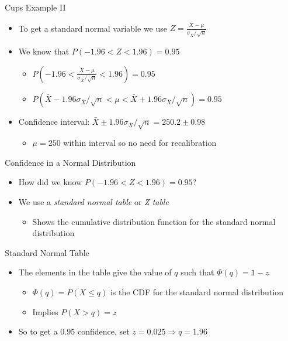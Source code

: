 \documentclass{beamer}
\begin{document}
\begin{frame}{Cups Example II}  
\begin{itemize} 
 \item To get a standard normal variable we use $Z = \frac{\bar{X} - \mu}{\sigma_{\bar{X}}/\sqrt{n}}$ 
 \item We know that $P(-1.96 < Z < 1.96) = 0.95$ 
 \begin{itemize}
 \item $P(-1.96 < \frac{\bar{X} - \mu}{\sigma_{\bar{X}}/\sqrt{n}} < 1.96) = 0.95$ 
 \item $P(\bar{X} - 1.96 \sigma_{\bar{X}}/\sqrt{n}  < \mu < \bar{X} + 1.96 \sigma_{\bar{X}}/\sqrt{n}) = 0.95$ 
\end{itemize}
 \item Confidence interval: $\bar{X} \pm 1.96 \sigma_{\bar{X}}/\sqrt{n} = 250.2 \pm 0.98$ 
 \begin{itemize} 
 \item $\mu = 250$ within interval so no need for recalibration
 \end{itemize}
\end{itemize}
\end{frame}

\begin{frame}{Confidence in a Normal Distribution}  
\begin{itemize} 
 \item How did we know $P(-1.96 < Z < 1.96) = 0.95$? 
 \item We use a \emph{standard normal table} or \emph{Z table}
 \begin{itemize}
 \item Shows the cumulative distribution function for the standard normal distribution 
 \end{itemize} 
\end{itemize}
\end{frame}

\begin{frame}{Standard Normal Table}
\begin{itemize} 
 \item The elements in the table give the value of $q$ such that $\Phi(q) = 1 - z$ 
 \begin{itemize}
 \item $\Phi(q) = P(X \leq q)$ is the CDF for the standard normal distribution
 \item Implies $P(X > q) = z$
 \end{itemize} 
 \item So to get a $0.95$ confidence, set  $z = 0.025 \Rightarrow q = 1.96$ 
\end{itemize}
\end{frame}
\end{document}
